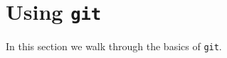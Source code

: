 \documentclass{ximera}
\begin{document}
\section{Using \texttt{git}}

In this section we walk through the basics of \verb!git!.



\end{document}
